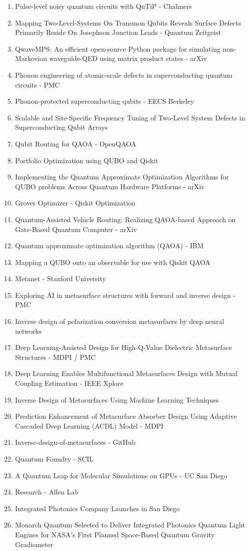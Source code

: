 \documentclass[11pt, a4paper]{article}
\begin{document}
\begin{enumerate}
    \item Pulse-level noisy quantum circuits with QuTiP - Chalmers
    \item Mapping Two-Level-Systems On Transmon Qubits Reveals Surface Defects Primarily Reside On Josephson Junction Leads - Quantum Zeitgeist
    \item QwaveMPS: An efficient open-source Python package for simulating non-Markovian waveguide-QED using matrix product states - arXiv
    \item Phonon engineering of atomic-scale defects in superconducting quantum circuits - PMC
    \item Phonon-protected superconducting qubits - EECS Berkeley
    \item Scalable and Site-Specific Frequency Tuning of Two-Level System Defects in Superconducting Qubit Arrays
    \item Qubit Routing for QAOA - OpenQAOA
    \item Portfolio Optimization using QUBO and Qiskit
    \item Implementing the Quantum Approximate Optimization Algorithms for QUBO problems Across Quantum Hardware Platforms - arXiv
    \item Grover Optimizer - Qiskit Optimization
    \item Quantum-Assisted Vehicle Routing: Realizing QAOA-based Approach on Gate-Based Quantum Computer - arXiv
    \item Quantum approximate optimization algorithm (QAOA) - IBM
    \item Mapping a QUBO onto an observable for use with Qiskit QAOA
    \item Metanet - Stanford University
    \item Exploring AI in metasurface structures with forward and inverse design - PMC
    \item Inverse design of polarization conversion metasurfaces by deep neural networks
    \item Deep Learning-Assisted Design for High-Q-Value Dielectric Metasurface Structures - MDPI / PMC
    \item Deep Learning Enables Multifunctional Metasurfaces Design with Mutual Coupling Estimation - IEEE Xplore
    \item Inverse Design of Metasurfaces Using Machine Learning Techniques
    \item Prediction Enhancement of Metasurface Absorber Design Using Adaptive Cascaded Deep Learning (ACDL) Model - MDPI
    \item Inverse-design-of-metasurfaces - GitHub
    \item Quantum Foundry - SCIL
    \item A Quantum Leap for Molecular Simulations on GPUs - UC San Diego
    \item Research - Allen Lab
    \item Integrated Photonics Company Launches in San Diego
    \item Monarch Quantum Selected to Deliver Integrated Photonics Quantum Light Engines for NASA's First Planned Space-Based Quantum Gravity Gradiometer
\end{enumerate}
\end{document}

